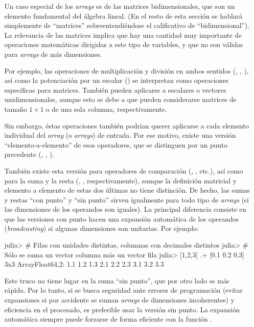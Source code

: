 ﻿\documentclass[spanish]{article}
\begin{document}
Un caso especial de los \emph{arrays} es de las matrices bidimensionales,
que son un elemento fundamental del álgebra lineal. (En el resto de
esta sección se hablará simplemente de ``matrices'' sobreentendiéndose
el calificativo de ``bidimensional''). La relevancia de las matrices
implica que hay una cantidad muy importante de operaciones matemáticas
dirigidas a este tipo de variables, y que no son válidas para \emph{arrays}
de más dimensiones.

Por ejemplo, las operaciones de multiplicación y división en ambos
sentidos (\code{*}, \code{/}, \code{\\}
), así como la potenciación por un escalar (\code{^}) se interpretan como
operaciones específicas para matrices. También pueden aplicarse a
escalares o vectores unidimensionales, aunque esto se debe a que pueden
considerarse matrices de tamaño $1\times{}1$ o de una sola columna,
respectivamente.

Sin embargo, éstas operaciones también podrían querer aplicarse a
cada elemento individual del \emph{array} (o \emph{arrays}) de entrada.
Por ese motivo, existe una versión ``elemento-a-elemento'' de
esos operadores, que se distinguen por un punto precedente (,
, ).

También existe esta versión para operadores de comparación (,
, etc.), así como para  la suma y la resta (,
, respectivamente), aunque la definición matricial y elemento
a elemento de estas dos últimas no tiene distinción. De hecho, las sumas y restas ``con
punto'' y ``sin punto'' sirven igualmente para todo tipo de \emph{arrays}
(si las dimensiones de los operandos son iguales). La principal diferencia
consiste en que las versiones con punto hacen una expansión automática
de los operandos (\emph{broadcasting}) si algunas dimensiones son
unitarias. Por ejemplo:

julia> \# Filas con unidades distintas, columnas con decimales distintos
julia> \# Sólo se suma un vector columna más un vector fila
julia> {[}1,2,3{]} .+ {[}0.1 0.2 0.3{]}
3x3 Array{Float64,2}:
 1.1 1.2 1.3
 2.1 2.2 2.3
 3.1 3.2 3.3

Este truco no tiene lugar en la suma ``sin punto'', que por otro
lado es más rápida. Por lo tanto, si se busca seguridad ante errores
de programación (evitar expansiones si por accidente se suman \emph{arrays}
de dimensiones incoherentes) y eficiencia en el procesado, es preferible
usar la versión sin punto. La expansión automática siempre puede forzarse
de forma eficiente con la función .
\end{document}
